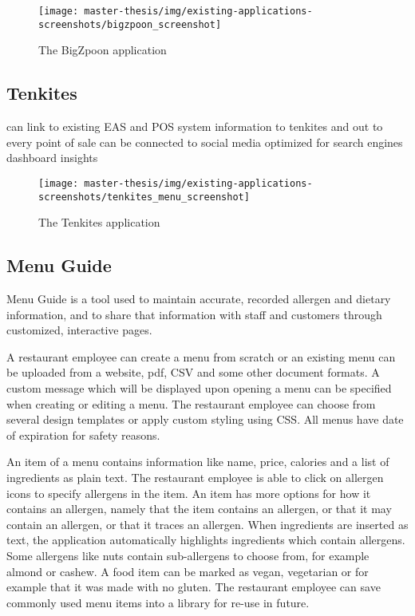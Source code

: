   \begin{figure}[h]
    \centering
    \texttt{[image: master-thesis/img/existing-applications-screenshots/bigzpoon\_screenshot]}
    \caption{The BigZpoon application}
  \end{figure}

\newpage

\subsection*{Tenkites}
  can link to existing EAS and POS system
  information to tenkites and out to every point of sale
  can be connected to social media
  optimized for search engines
  dashboard insights

  \begin{figure}[h]
    \centering
    \texttt{[image: master-thesis/img/existing-applications-screenshots/tenkites\_menu\_screenshot]}
    \caption{The Tenkites application}
  \end{figure}

\subsection*{Menu Guide}
  Menu Guide is a tool used to maintain accurate, recorded allergen and dietary information, and to share that information with staff and customers through customized, interactive pages.

  A restaurant employee can create a menu from scratch or an existing menu can be uploaded from a website, pdf, CSV and some other document formats. 
  A custom message which will be displayed upon opening a menu can be specified when creating or editing a menu.
  The restaurant employee can choose from several design templates or apply custom styling using CSS.
  All menus have date of expiration for safety reasons.

  An item of a menu contains information like name, price, calories and a list of ingredients as plain text.
  The restaurant employee is able to click on allergen icons to specify allergens in the item.
  An item has more options for how it contains an allergen, namely that the item contains an allergen, or that it may contain an allergen, or that it traces an allergen.
  When ingredients are inserted as text, the application automatically highlights ingredients which contain allergens.
  Some allergens like nuts contain sub-allergens to choose from, for example almond or cashew.
  A food item can be marked as vegan, vegetarian or for example that it was made with no gluten.
  The restaurant employee can save commonly used menu items into a library for re-use in future. 

